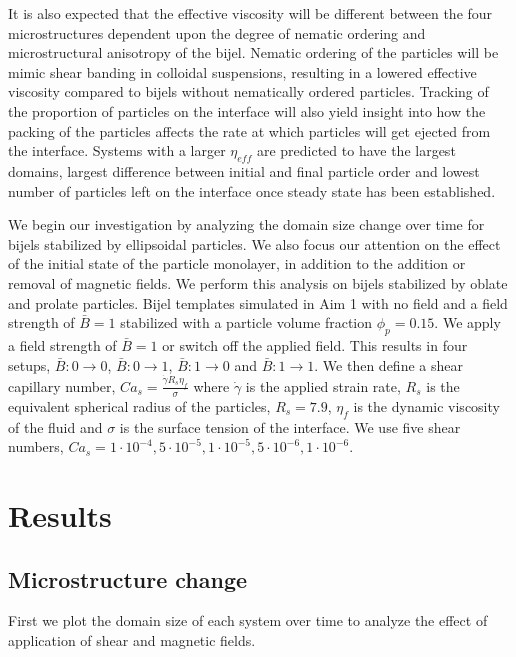 It is also expected that the effective viscosity will be different between the four microstructures dependent upon the 
degree of nematic ordering and microstructural anisotropy of the bijel. Nematic ordering of the particles will be mimic 
shear banding in colloidal suspensions, resulting in a lowered effective viscosity compared to bijels without nematically 
ordered particles. \cite{xu_relation_2013, vermant_flow-induced_2005} Tracking of the proportion of particles on the 
interface will also yield insight into how the packing of the particles affects the rate at which particles will get 
ejected from the interface. Systems with a larger $\eta_{eff}$ are predicted to have the largest domains, largest 
difference between initial and final particle order and lowest number of particles left on the interface once steady 
state has been established. 

We begin our investigation by analyzing the domain size change over time for bijels stabilized by ellipsoidal particles. We also
focus our attention on the effect of the initial state of the particle monolayer, in addition to the addition or removal of magnetic
fields. We perform this analysis on bijels stabilized by oblate and prolate particles. Bijel templates simulated in Aim 1 with no
field and a field strength of $\bar{B} = 1$ stabilized with a particle volume fraction $\phi_p = 0.15$. We apply a field strength of
$\bar{B} = 1$ or switch off the applied field. This results in four setups, $\bar{B}:0\rightarrow 0$, $\bar{B}:0\rightarrow 1$,
$\bar{B}:1\rightarrow 0$ and $\bar{B}:1\rightarrow 1$. We then define a shear capillary number, 
$Ca_s = \frac{\dot{\gamma} R_{s} \eta_{f}}{\sigma}$ where $\dot{\gamma}$ is the applied strain rate, $R_s$ is the equivalent
spherical radius of the particles, $R_s = 7.9$, $\eta_f$ is the dynamic viscosity of the fluid and $\sigma$ is the surface tension
of the interface. We use five shear numbers, $Ca_s = 1\cdot10^{-4}, 5\cdot10^{-5}, 1\cdot10^{-5}, 5\cdot10^{-6}, 1\cdot10^{-6}$.

\section{Results}\label{sec:results_p3}
\subsection{Microstructure change}

First we plot the domain size of each system over time to analyze the effect of application of shear and magnetic fields.

